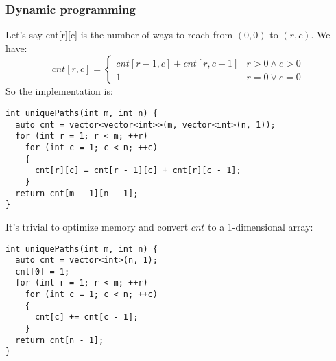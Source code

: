 \documentclass{book}
\begin{document}
	\subsubsection{Dynamic programming}
	Let's say cnt[r][c] is the number of ways to reach from $(0, 0)$ to $(r, c)$. We have:
	\begin{equation*}
		cnt[r, c] = \begin{cases}
			cnt[r - 1, c] + cnt[r, c - 1] & r > 0 \land c > 0 \\
			1 & r = 0 \lor c = 0
		\end{cases}
	\end{equation*}
	So the implementation is:
	\begin{lstlisting}
int uniquePaths(int m, int n) {
  auto cnt = vector<vector<int>>(m, vector<int>(n, 1));
  for (int r = 1; r < m; ++r)
    for (int c = 1; c < n; ++c)
    {
      cnt[r][c] = cnt[r - 1][c] + cnt[r][c - 1];
    }
  return cnt[m - 1][n - 1];
}
	\end{lstlisting}
	It's trivial to optimize memory and convert $cnt$ to a 1-dimensional array:
	\begin{lstlisting}
int uniquePaths(int m, int n) {
  auto cnt = vector<int>(n, 1);
  cnt[0] = 1;
  for (int r = 1; r < m; ++r)
    for (int c = 1; c < n; ++c)
    {
      cnt[c] += cnt[c - 1];
    }
  return cnt[n - 1];
}
	\end{lstlisting}
\end{document}
